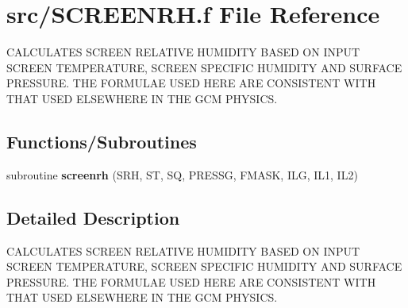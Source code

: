 \hypertarget{SCREENRH_8f}{}\section{src/\+S\+C\+R\+E\+E\+N\+R\+H.f File Reference}
\label{SCREENRH_8f}


C\+A\+L\+C\+U\+L\+A\+T\+E\+S S\+C\+R\+E\+E\+N R\+E\+L\+A\+T\+I\+V\+E H\+U\+M\+I\+D\+I\+T\+Y B\+A\+S\+E\+D O\+N I\+N\+P\+U\+T S\+C\+R\+E\+E\+N T\+E\+M\+P\+E\+R\+A\+T\+U\+R\+E, S\+C\+R\+E\+E\+N S\+P\+E\+C\+I\+F\+I\+C H\+U\+M\+I\+D\+I\+T\+Y A\+N\+D S\+U\+R\+F\+A\+C\+E P\+R\+E\+S\+S\+U\+R\+E. T\+H\+E F\+O\+R\+M\+U\+L\+A\+E U\+S\+E\+D H\+E\+R\+E A\+R\+E C\+O\+N\+S\+I\+S\+T\+E\+N\+T W\+I\+T\+H T\+H\+A\+T U\+S\+E\+D E\+L\+S\+E\+W\+H\+E\+R\+E I\+N T\+H\+E G\+C\+M P\+H\+Y\+S\+I\+C\+S.  


\subsection*{Functions/\+Subroutines}
\begin{DoxyCompactItemize}
\item 
\hypertarget{SCREENRH_8f_a619c7e9b0317e5918565e3fb98936b4b}{}subroutine {\bfseries screenrh} (S\+R\+H, S\+T, S\+Q, P\+R\+E\+S\+S\+G, F\+M\+A\+S\+K, I\+L\+G, I\+L1, I\+L2)\label{SCREENRH_8f_a619c7e9b0317e5918565e3fb98936b4b}

\end{DoxyCompactItemize}


\subsection{Detailed Description}
C\+A\+L\+C\+U\+L\+A\+T\+E\+S S\+C\+R\+E\+E\+N R\+E\+L\+A\+T\+I\+V\+E H\+U\+M\+I\+D\+I\+T\+Y B\+A\+S\+E\+D O\+N I\+N\+P\+U\+T S\+C\+R\+E\+E\+N T\+E\+M\+P\+E\+R\+A\+T\+U\+R\+E, S\+C\+R\+E\+E\+N S\+P\+E\+C\+I\+F\+I\+C H\+U\+M\+I\+D\+I\+T\+Y A\+N\+D S\+U\+R\+F\+A\+C\+E P\+R\+E\+S\+S\+U\+R\+E. T\+H\+E F\+O\+R\+M\+U\+L\+A\+E U\+S\+E\+D H\+E\+R\+E A\+R\+E C\+O\+N\+S\+I\+S\+T\+E\+N\+T W\+I\+T\+H T\+H\+A\+T U\+S\+E\+D E\+L\+S\+E\+W\+H\+E\+R\+E I\+N T\+H\+E G\+C\+M P\+H\+Y\+S\+I\+C\+S. 

